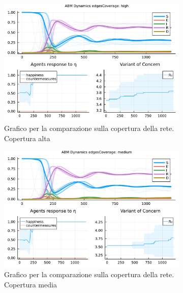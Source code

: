 \begin{figure}[!hb]
	\centering
	\begin{subfigure}[b]{0.3\textwidth}
		\centering
		\includegraphics[width=\textwidth]{img/SocialNetworkABM_1_EC.pdf}
		\caption{Grafico per la comparazione sulla copertura della rete. Copertura alta}
		\label{fig:comparison_highCoverage}
	\end{subfigure}
	\hfill
	\begin{subfigure}[b]{0.3\textwidth}
		\centering
		\includegraphics[width=\textwidth]{img/SocialNetworkABM_2_EC.pdf}
		\caption{Grafico per la comparazione sulla copertura della rete. Copertura media}
		\label{fig:comparison_mediumCoverage}
	\end{subfigure}
	\hfill
	\begin{subfigure}[b]{0.3\textwidth}
		\centering

\end{subfigure}
\end{figure}
